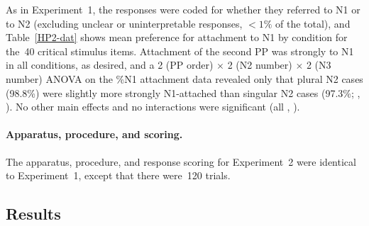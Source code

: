 \documentclass[12pt,titlepage]{article}
\newcommand{\IGNORE}[1]{} %
\newcommand{\showp}[1]{\IGNORE{#1}} %
\begin{document}
As in Experiment~1, the responses were coded for whether they referred to
N1 or to N2 (excluding unclear or uninterpretable responses, $<1\%$ of the
total), and Table~\ref{HP2-dat} shows mean preference for attachment to N1
by condition for the~40 critical stimulus items.  Attachment of the second
PP was strongly to N1 in all conditions, as desired, and a 2 (PP order)
$\times$ 2 (N2 number) $\times$ 2 (N3 number) ANOVA on the \%N1 attachment
data revealed only that plural N2 cases (98.8\%) were slightly more
strongly N1-attached than singular N2 cases (97.3\%; ,
\showp{, \p{05}}).  No other main effects and no interactions
were significant (all \Fsweak[1.8], \psweak[15]).

\paragraph{Apparatus, procedure, and scoring.} The apparatus, procedure, and
response scoring for Experiment~2 were identical to Experiment~1, except
that there were~120 trials.

\subsection{Results}
\end{document}
